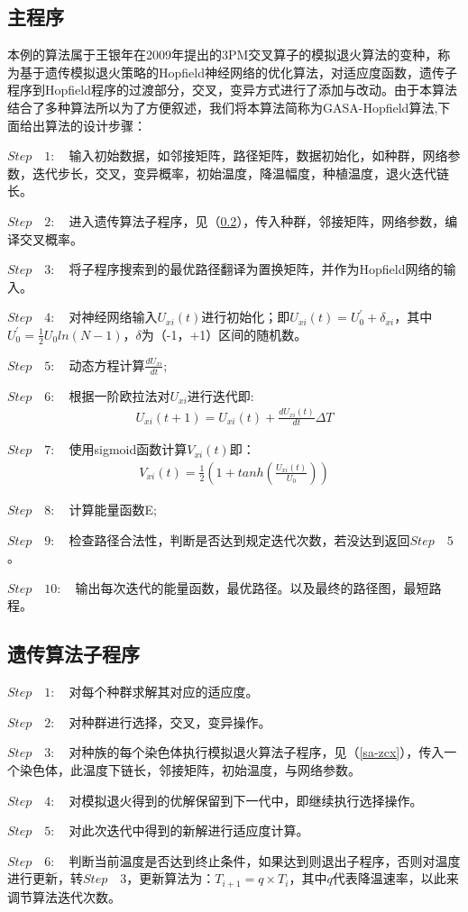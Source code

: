 \subsection{主程序}
本例的算法属于王银年在2009年提出的3PM交叉算子的模拟退火算法的变种，称为基于遗传模拟退火策略的Hopfield神经网络的优化算法，对适应度函数，遗传子程序到Hopfield程序的过渡部分，交叉，变异方式进行了添加与改动。由于本算法结合了多种算法所以为了方便叙述，我们将本算法简称为GASA-Hopfield算法,下面给出算法的设计步骤：
\par
$Step \quad 1: \quad $输入初始数据，如邻接矩阵，路径矩阵，数据初始化，如种群，网络参数，迭代步长，交叉，变异概率，初始温度，降温幅度，种植温度，退火迭代链长。
\par
$Step \quad 2: \quad $进入遗传算法子程序，见（\ref{ga-zcx}），传入种群，邻接矩阵，网络参数，编译交叉概率。
\par
$Step \quad 3: \quad $将子程序搜索到的最优路径翻译为置换矩阵，并作为Hopfield网络的输入。
\par
$Step \quad 4: \quad $对神经网络输入$U_{xi}(t)$进行初始化；即$U_{xi}(t) = U^{'}_0+\delta_{xi}$，其中$U^{'}_0 = \frac{1}{2}U_0ln(N-1)$，$\delta$为（-1，+1）区间的随机数。
\par
$Step \quad 5: \quad $动态方程计算$\frac{dU_{xi}}{dt}$;
\par
$Step \quad 6: \quad $根据一阶欧拉法对$U_{xi}进行迭代$即:
\begin{align}
    U_{xi}(t+1) = U_{xi}(t) + \frac{dU_{xi}(t)}{dt}\Delta T
\end{align}
\par
$Step \quad 7: \quad $使用sigmoid函数计算$V_{xi}(t)$即：
\begin{align}
    V_{xi}(t) = \frac{1}{2} (1+tanh(\frac{U_{xi}(t)}{U_0}))
\end{align}
\par
$Step \quad 8: \quad $计算能量函数E;
\par
$Step \quad 9: \quad $检查路径合法性，判断是否达到规定迭代次数，若没达到返回$Step \quad 5$。
\par
$Step \quad 10: \quad $输出每次迭代的能量函数，最优路径。以及最终的路径图，最短路程。
\subsection{遗传算法子程序}
\label{ga-zcx}%
\par
$Step \quad 1: \quad $对每个种群求解其对应的适应度。
\par
$Step \quad 2: \quad $对种群进行选择，交叉，变异操作。
\par
$Step \quad 3: \quad $对种族的每个染色体执行模拟退火算法子程序，见（\ref{sa-zcx}），传入一个染色体，此温度下链长，邻接矩阵，初始温度，与网络参数。
\par
$Step \quad 4: \quad $对模拟退火得到的优解保留到下一代中，即继续执行选择操作。
\par
$Step \quad 5: \quad $对此次迭代中得到的新解进行适应度计算。
\par
$Step \quad 6: \quad $判断当前温度是否达到终止条件，如果达到则退出子程序，否则对温度进行更新，转$Step \quad 3$，更新算法为：$T_{i+1} = q \times T_i$，其中$q$代表降温速率，以此来调节算法迭代次数。
